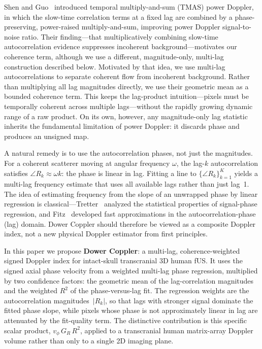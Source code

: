 \documentclass[11pt]{article}
\begin{document}
Shen and Guo~\cite{shen2022tmas} introduced temporal
multiply-and-sum (TMAS) power Doppler, in which the slow-time
correlation terms at a fixed lag are combined by a phase-preserving,
power-raised multiply-and-sum, improving power Doppler
signal-to-noise ratio.  Their finding---that multiplicatively
combining slow-time autocorrelation evidence suppresses incoherent
background---motivates our coherence term, although we use a
different, magnitude-only, multi-lag construction described below.
Motivated by that idea, we use multi-lag autocorrelations to separate
coherent flow from incoherent background.  Rather than multiplying all
lag magnitudes directly, we use their geometric mean as a bounded
coherence term.  This keeps the lag-product intuition---pixels must be
temporally coherent across multiple lags---without the rapidly growing
dynamic range of a raw product.  On its own, however, any
magnitude-only lag statistic inherits the fundamental limitation of
power Doppler: it discards phase and produces an unsigned map.

A natural remedy is to use the autocorrelation phases, not just the
magnitudes.  For a coherent scatterer moving at angular frequency
$\omega$, the lag-$k$ autocorrelation satisfies $\angle R_k \approx
\omega k$: the phase is linear in lag.  Fitting a line to
$\{\angle R_k\}_{k=1}^{K}$ yields a multi-lag frequency estimate that
uses all available lags rather than just lag~1.  The idea of
estimating frequency from the slope of an unwrapped phase by linear
regression is classical---Tretter~\cite{tretter1985phaseregression}
analyzed the statistical properties of signal-phase regression, and
Fitz~\cite{fitz1994frequency} developed fast approximations in the
autocorrelation-phase (lag) domain.  Dower Coppler should therefore be viewed as a
composite Doppler index, not a new physical Doppler estimator from first
principles.

In this paper we propose \textbf{Dower Coppler}: a multi-lag,
coherence-weighted signed Doppler index for intact-skull transcranial
3D human fUS.  It uses the signed axial phase velocity from a weighted
multi-lag phase regression, multiplied by two confidence factors: the
geometric mean of the lag-correlation magnitudes and the weighted
$R^2$ of the phase-versus-lag fit.  The regression weights are the
autocorrelation magnitudes~$|R_k|$, so that lags with stronger signal
dominate the fitted phase slope, while pixels whose phase is not
approximately linear in lag are attenuated by the fit-quality term.
The distinctive contribution is this specific scalar product,
$v_\phi\,G_R\,R^2$, applied to a transcranial human matrix-array
Doppler volume rather than only to a single 2D imaging plane.
\end{document}

